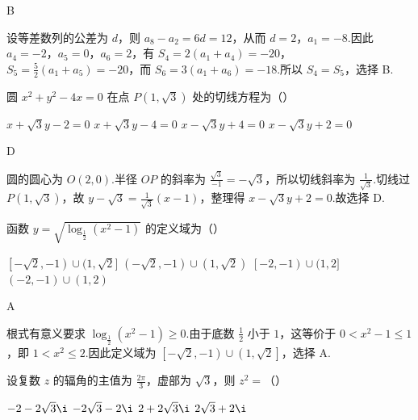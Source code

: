 \begin{answer}B\end{answer}

\begin{solution}
设等差数列的公差为 \(d\)，则 \(a_8-a_2=6d=12\)，从而 \(d=2\)，\(a_1=-8\).因此 \(a_4=-2\)，\(a_5=0\)，\(a_6=2\)，有 \(S_4=2(a_1+a_4)=-20\)，\(S_5=\frac{5}{2}(a_1+a_5)=-20\)，而 \(S_6=3(a_1+a_6)=-18\).所以 \(S_4=S_5\)，选择 B.
\end{solution}

\begin{problem}
圆 \(x^{2} + y^{2} - 4x = 0\) 在点 \(P(1, \sqrt{3})\) 处的切线方程为（\quad）

\choices
    {\(x + \sqrt{3} y - 2 = 0\)}
    {\(x + \sqrt{3} y - 4 = 0\)}
    {\(x - \sqrt{3} y + 4 = 0\)}
    {\(x - \sqrt{3} y + 2 = 0\)}
\end{problem}

\begin{answer}D\end{answer}

\begin{solution}
圆的圆心为 \(O(2,0)\).半径 \(OP\) 的斜率为 \(\frac{\sqrt{3}}{-1}=-\sqrt{3}\)，所以切线斜率为 \(\frac{1}{\sqrt{3}}\).切线过 \(P(1,\sqrt{3})\)，故 \(y-\sqrt{3}=\frac{1}{\sqrt{3}}(x-1)\)，整理得 \(x-\sqrt{3}y+2=0\).故选择 D.
\end{solution}

\begin{problem}
函数 \(y = \sqrt{\log_{\frac{1}{2}}(x^2 - 1)}\) 的定义域为（\quad）

\choices
    {\(\left[-\sqrt{2}, -1\right) \cup (1, \sqrt{2}]\)}
    {\((-\sqrt{2}, -1) \cup (1, \sqrt{2})\)}
    {\(\left[-2, -1\right) \cup (1, 2]\)}
    {\((-2, -1) \cup (1, 2)\)}
\end{problem}

\begin{answer}A\end{answer}

\begin{solution}
根式有意义要求 \(\log_{\frac12}(x^2-1)\geqslant0\).由于底数 \(\frac12\) 小于 \(1\)，这等价于 \(0<x^2-1\leqslant1\)，即 \(1<x^2\leqslant2\).因此定义域为 \(\left[-\sqrt{2},-1\right)\cup\left(1,\sqrt{2}\right]\)，选择 A.
\end{solution}

\begin{problem}
设复数 \(z\) 的辐角的主值为 \(\frac{2\pi}{3}\)，虚部为 \(\sqrt{3}\)，则 \(z^2 =\)（\quad）

\choices
    {\(-2 - 2\sqrt{3}\i\)}
    {\(-2\sqrt{3} - 2\i\)}
    {\(2 + 2\sqrt{3}\i\)}
    {\(2\sqrt{3} + 2\i\)}
\end{problem}

